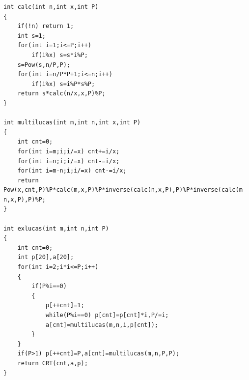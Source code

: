 \begin{verbatim}
int calc(int n,int x,int P)
{
    if(!n) return 1;
    int s=1;
    for(int i=1;i<=P;i++)
        if(i%x) s=s*i%P;
    s=Pow(s,n/P,P);
    for(int i=n/P*P+1;i<=n;i++)
        if(i%x) s=i%P*s%P;
    return s*calc(n/x,x,P)%P;
}

int multilucas(int m,int n,int x,int P)
{
    int cnt=0;
    for(int i=m;i;i/=x) cnt+=i/x;
    for(int i=n;i;i/=x) cnt-=i/x;
    for(int i=m-n;i;i/=x) cnt-=i/x;
    return Pow(x,cnt,P)%P*calc(m,x,P)%P*inverse(calc(n,x,P),P)%P*inverse(calc(m-n,x,P),P)%P;
}

int exlucas(int m,int n,int P)
{
    int cnt=0;
    int p[20],a[20];
    for(int i=2;i*i<=P;i++)
    {
        if(P%i==0)
        {
            p[++cnt]=1;
            while(P%i==0) p[cnt]=p[cnt]*i,P/=i;
            a[cnt]=multilucas(m,n,i,p[cnt]);
        }
    }
    if(P>1) p[++cnt]=P,a[cnt]=multilucas(m,n,P,P);
    return CRT(cnt,a,p);
}
\end{verbatim}